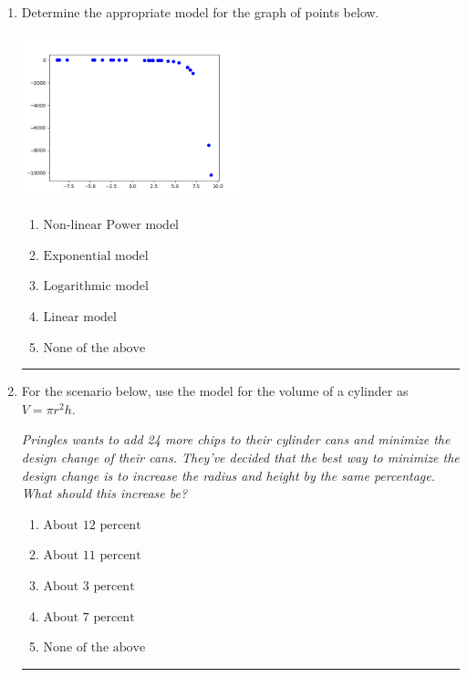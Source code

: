 \documentclass[14pt]{extbook}
\newcommand{\litem}[1]{\item#1\hspace*{-1cm}\rule{\textwidth}{0.4pt}}
\begin{document}
\begin{enumerate}
\litem{
Determine the appropriate model for the graph of points below.
\begin{center}
    \includegraphics[width=0.5\textwidth]{../Figures/identifyModelGraph12A.png}
\end{center}
\begin{enumerate}[label=\Alph*.]
\item \( \text{Non-linear Power model} \)
\item \( \text{Exponential model} \)
\item \( \text{Logarithmic model} \)
\item \( \text{Linear model} \)
\item \( \text{None of the above} \)

\end{enumerate} }
\litem{
For the scenario below, use the model for the volume of a cylinder as $V = \pi r^2 h$.
\begin{center}
    \textit{ Pringles wants to add 24 \text{percent} more chips to their cylinder cans and minimize the design change of their cans. They've decided that the best way to minimize the design change is to increase the radius and height by the same percentage. What should this increase be? }
\end{center}
\begin{enumerate}[label=\Alph*.]
\item \( \text{About } 12 \text{ percent} \)
\item \( \text{About } 11 \text{ percent} \)
\item \( \text{About } 3 \text{ percent} \)
\item \( \text{About } 7 \text{ percent} \)
\item \( \text{None of the above} \)


\end{enumerate}}
\end{enumerate}
\end{document}

